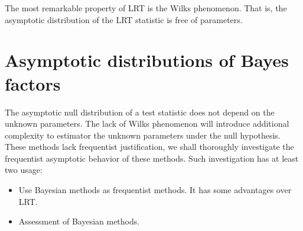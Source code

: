 \documentclass[11pt]{article}
\theoremstyle{plain}
\theoremstyle{definition}
\theoremstyle{remark}
\begin{document}
The most remarkable property of LRT is the Wilks phenomenon. That is, the asymptotic distribution of the LRT statistic is free of parameters.


\section{Asymptotic distributions of Bayes factors}

The asymptotic null distribution of a test statistic does not depend on the unknown parameters.
The lack of Wilks phenomenon will introduce additional complexity to estimator the unknown parameters under the null hypothesis.
These methods lack frequentist justification, we shall thoroughly investigate the frequentist asymptotic behavior of these methods.
Such investigation has at least two usage:
\begin{itemize}
    \item 
        Use Bayesian methods as frequentist methods.
        It has some advantages over LRT.
    \item
        Assessment of Bayesian methods.
\end{itemize}
\end{document}
